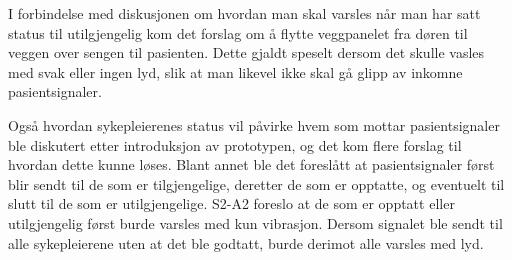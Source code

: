 \noindent
I forbindelse med diskusjonen om hvordan man skal varsles når man har satt status til utilgjengelig kom det forslag om å flytte veggpanelet fra døren til veggen over sengen til pasienten. Dette gjaldt speselt dersom det skulle vasles med svak eller ingen lyd, slik at man likevel ikke skal gå glipp av inkomne pasientsignaler.

\noindent
Også hvordan sykepleierenes status vil påvirke hvem som mottar pasientsignaler ble diskutert etter introduksjon av prototypen, og det kom flere forslag til hvordan dette kunne løses. Blant annet ble det foreslått at pasientsignaler først blir sendt til de som er tilgjengelige, deretter de som er opptatte, og eventuelt til slutt til de som er utilgjengelige. S2-A2 foreslo at de som er opptatt eller utilgjengelig først burde varsles med kun vibrasjon. Dersom signalet ble sendt til alle sykepleierene uten at det ble godtatt, burde derimot alle varsles med lyd.